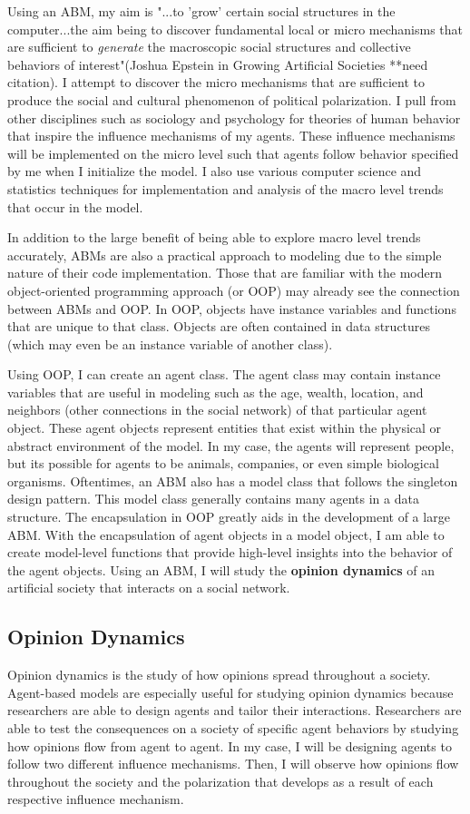 Using an ABM, my aim is "...to 'grow' certain social structures in the computer...the aim being to discover fundamental local or micro mechanisms that are sufficient to \textit{generate} the macroscopic social structures and collective behaviors of interest"(Joshua Epstein in Growing Artificial Societies **need citation). I attempt to discover the micro mechanisms that are sufficient to produce the social and cultural phenomenon of political polarization. I pull from other disciplines such as sociology and psychology for theories of human behavior that inspire the influence mechanisms of my agents. These influence mechanisms will be implemented on the micro level such that agents follow behavior specified by me when I initialize the model. I also use various computer science and statistics techniques for implementation and analysis of the macro level trends that occur in the model.    

In addition to the large benefit of being able to explore macro level trends accurately, ABMs are also a practical approach to modeling due to the simple nature of their code implementation. Those that are familiar with the modern object-oriented programming approach (or OOP) may already see the connection between ABMs and OOP. In OOP, objects have instance variables and functions that are unique to that class. Objects are often contained in data structures (which may even be an instance variable of another class). 

Using OOP, I can create an agent class. The agent class may contain instance variables that are useful in modeling such as the age, wealth, location, and neighbors (other connections in the social network) of that particular agent object. These agent objects represent entities that exist within the physical or abstract environment of the model. In my case, the agents will represent people, but its possible for agents to be animals, companies, or even simple biological organisms. Oftentimes, an ABM also has a model class that follows the singleton design pattern. This model class generally contains many agents in a data structure. The encapsulation in OOP greatly aids in the development of a large ABM. With the encapsulation of agent objects in a model object, I am able to create model-level functions that provide high-level insights into the behavior of the agent objects. Using an ABM, I will study the \textbf{opinion dynamics} of an artificial society that interacts on a social network.


\subsection{Opinion Dynamics}
Opinion dynamics is the study of how opinions spread throughout a society. Agent-based models are especially useful for studying opinion dynamics because researchers are able to design agents and tailor their interactions. Researchers are able to test the consequences on a society of specific agent behaviors by studying how opinions flow from agent to agent. In my case, I will be designing agents to follow two different influence mechanisms. Then, I will observe how opinions flow throughout the society and the polarization that develops as a result of each respective influence mechanism.

